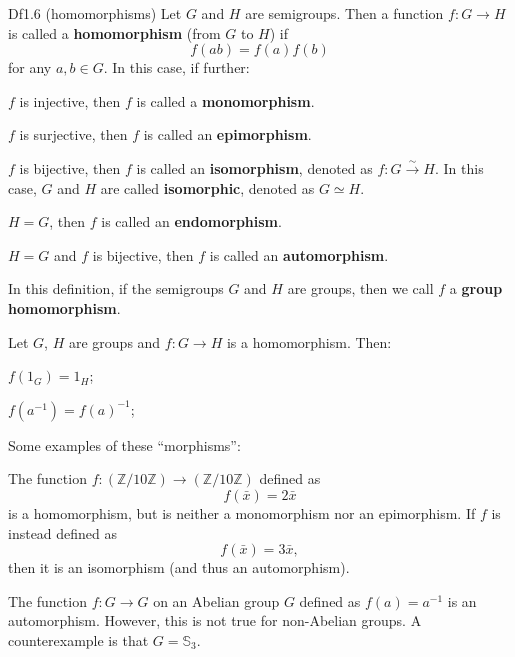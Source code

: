\documentclass{article}
\begin{document}
\begin{Df}{Df1.6 (homomorphisms)}
    Let $G$ and $H$ are semigroups. Then a function $f: G\to H$ is called a \textbf{homomorphism} (from $G$ to $H$) if 
    $$ f(ab) = f(a)f(b) $$
    for any $a, b\in G$. In this case, if further:
    \begin{compactenum}
        \item $f$ is injective, then $f$ is called a \textbf{monomorphism}.
        \item $f$ is surjective, then $f$ is called an \textbf{epimorphism}.
        \item $f$ is bijective, then $f$ is called an \textbf{isomorphism}, denoted as $f: G\overset{\sim}{\to} H$. In this case, $G$ and $H$ are called \textbf{isomorphic}, denoted as $G\simeq H$.
        \item $H = G$, then $f$ is called an \textbf{endomorphism}.
        \item $H = G$ and $f$ is bijective, then $f$ is called an \textbf{automorphism}.
    \end{compactenum}
\end{Df}

\begin{Rmk}{}
    \textcolor{Df}{In this definition, if the semigroups $G$ and $H$ are groups, then we call $f$ a \textbf{group homomorphism}.}
    \textcolor{Th}{Let $G$, $H$ are groups and $f: G\to H$ is a homomorphism. Then:
    \begin{compactenum}
        \item $f(1_G) = 1_H$;
        \item $f(a^{-1}) = f(a)^{-1}$;
    \end{compactenum}}
    \textcolor{Th}{Some examples of these ``morphisms'':
    \begin{compactenum}
        \item The function $f: (\mathbb{Z}/10\mathbb{Z})\to (\mathbb{Z}/10\mathbb{Z})$ defined as
        $$ f(\bar{x}) = 2\bar{x} $$
        is a homomorphism, but is neither a monomorphism nor an epimorphism. If $f$ is instead defined as
        $$ f(\bar{x}) = 3\bar{x}, $$
        then it is an isomorphism (and thus an automorphism).
        \item The function $f: G\to G$ on an Abelian group $G$ defined as $f(a) = a^{-1}$ is an automorphism. However, this is not true for non-Abelian groups. A counterexample is that $G = \mathbb{S}_3$.
    \end{compactenum}}
\end{Rmk}
\end{document}
